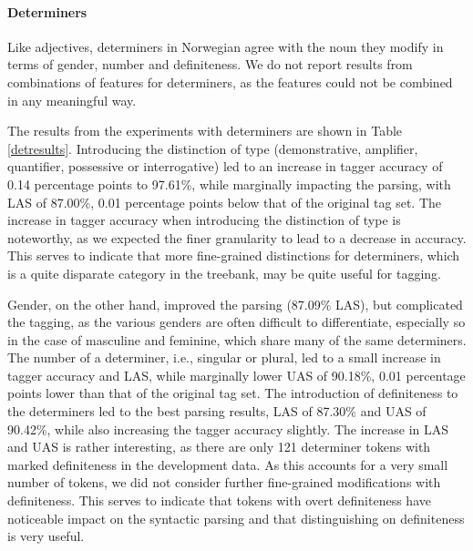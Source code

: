 \documentclass[11pt,a4paper]{article}
\begin{document}
\paragraph{Determiners}
Like adjectives, determiners in Norwegian agree with the noun they modify in
terms of gender, number and definiteness. We do not report results from
combinations of features for determiners, as the features could not be combined
in any meaningful way.


The results from the experiments with determiners are shown in Table
\ref{detresults}. Introducing the distinction of type (demonstrative,
amplifier, quantifier, possessive or interrogative) led to an increase in
tagger accuracy of 0.14 percentage points to 97.61\%, while marginally
impacting the parsing, with LAS of 87.00\%, 0.01 percentage points below that
of the original tag set.  The increase in tagger accuracy when introducing the
distinction of type is noteworthy, as we expected the finer granularity to lead
to a decrease in accuracy. This serves to indicate that more fine-grained
distinctions for determiners, which is a quite disparate category in the
treebank, may be quite useful for tagging.


Gender, on the other hand, improved the parsing (87.09\% LAS), but complicated
the tagging, as the various genders are often difficult to differentiate,
especially so in the case of masculine and feminine, which share many of the
same determiners. The number of a determiner, i.e., singular or plural, led to
a small increase in tagger accuracy and LAS, while marginally lower UAS of
90.18\%, 0.01 percentage points lower than that of the original tag set. The
introduction of definiteness to the determiners led to the best parsing
results, LAS of 87.30\% and UAS of 90.42\%, while also increasing the tagger
accuracy slightly. The increase in LAS and UAS is rather interesting, as there
are only 121 determiner tokens with marked definiteness in the development
data. As this accounts for a very small number of tokens, we did not consider
further fine-grained modifications with definiteness. This serves to indicate
that tokens with overt definiteness have noticeable impact on the syntactic
parsing and that distinguishing on definiteness is very useful.
\end{document}
